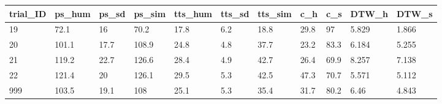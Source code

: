 \begin{tabular}{lllllllllll}
trial_ID & ps_hum & ps_sd & ps_sim & tts_hum & tts_sd & tts_sim & c_h & c_s & DTW_h & DTW_s \\ 
\hline 
19 & 72.1 & 16 & 70.2 & 17.8 & 6.2 & 18.8 & 29.8 & 97 & 5.829 & 1.866 \\ 
20 & 101.1 & 17.7 & 108.9 & 24.8 & 4.8 & 37.7 & 23.2 & 83.3 & 6.184 & 5.255 \\ 
21 & 119.2 & 22.7 & 126.6 & 28.4 & 4.9 & 42.7 & 26.4 & 69.9 & 8.257 & 7.138 \\ 
22 & 121.4 & 20 & 126.1 & 29.5 & 5.3 & 42.5 & 47.3 & 70.7 & 5.571 & 5.112 \\ 
999 & 103.5 & 19.1 & 108 & 25.1 & 5.3 & 35.4 & 31.7 & 80.2 & 6.46 & 4.843 \\ 
\hline 
\end{tabular}